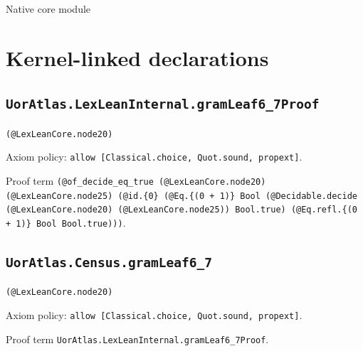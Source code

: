 \documentclass[11pt]{article}
\begin{document}
\begin{center}{\LARGE Native core module}\end{center}
\section*{Kernel-linked declarations}
\subsection*{\texttt{UorAtlas.LexLeanInternal.gramLeaf6\_7Proof}}
\noindent\texttt{(@LexLeanCore.node20)}\par
\noindent Axiom policy: \texttt{allow [Classical.choice, Quot.sound, propext]}.\par
\noindent Proof term \texttt{(@of\_decide\_eq\_true (@LexLeanCore.node20) (@LexLeanCore.node25) (@id.\{0\} (@Eq.\{(0 + 1)\} Bool (@Decidable.decide (@LexLeanCore.node20) (@LexLeanCore.node25)) Bool.true) (@Eq.refl.\{(0 + 1)\} Bool Bool.true)))}.\par
\subsection*{\texttt{UorAtlas.Census.gramLeaf6\_7}}
\noindent\texttt{(@LexLeanCore.node20)}\par
\noindent Axiom policy: \texttt{allow [Classical.choice, Quot.sound, propext]}.\par
\noindent Proof term \texttt{UorAtlas.LexLeanInternal.gramLeaf6\_7Proof}.\par
\end{document}
